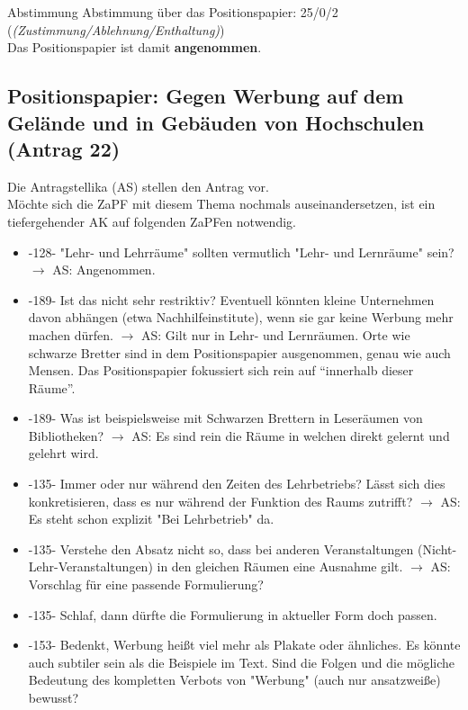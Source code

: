     \begin{success}{Abstimmung}
      Abstimmung über das Positionspapier: 25/0/2 (\textit{(Zustimmung/Ablehnung/Enthaltung)}) \\
      Das Positionspapier ist damit \textbf{angenommen}.
    \end{success}

  \subsection{Positionspapier: Gegen Werbung auf dem Gelände und in Gebäuden von Hochschulen (Antrag 22)}
    Die Antragstellika (AS) stellen den Antrag vor. \\
    Möchte sich die ZaPF mit diesem Thema nochmals auseinandersetzen, ist ein tiefergehender AK auf folgenden ZaPFen notwendig.

    \begin{itemize}
      \item -128- "Lehr- und Lehrräume" sollten vermutlich "Lehr- und Lernräume" sein?
        $\rightarrow$ AS: Angenommen.
      \item -189- Ist das nicht sehr restriktiv? Eventuell könnten kleine Unternehmen davon abhängen (etwa Nachhilfeinstitute), wenn sie gar keine Werbung mehr machen dürfen.
        $\rightarrow$ AS: Gilt nur in Lehr- und Lernräumen. Orte wie schwarze Bretter sind in dem Positionspapier ausgenommen, genau wie auch Mensen. Das Positionspapier fokussiert sich rein auf ``innerhalb dieser Räume''.
      \item -189- Was ist beispielsweise mit Schwarzen Brettern in Leseräumen von Bibliotheken?
        $\rightarrow$ AS: Es sind rein die Räume in welchen direkt gelernt und gelehrt wird.
      \item -135- Immer oder nur während den Zeiten des Lehrbetriebs? Lässt sich dies konkretisieren, dass es nur während der Funktion des Raums zutrifft?
        $\rightarrow$ AS: Es steht schon explizit "Bei Lehrbetrieb" da.
      \item -135- Verstehe den Absatz nicht so, dass bei anderen Veranstaltungen (Nicht-Lehr-Veranstaltungen) in den gleichen Räumen eine Ausnahme gilt.
        $\rightarrow$ AS: Vorschlag für eine passende Formulierung?
      \item -135- Schlaf, dann dürfte die Formulierung in aktueller Form doch passen.
      \item -153- Bedenkt, Werbung heißt viel mehr als Plakate oder ähnliches. Es könnte auch subtiler sein als die Beispiele im Text. Sind die Folgen und die mögliche Bedeutung des kompletten Verbots von "Werbung" (auch nur ansatzweiße) bewusst?
    \end{itemize}

